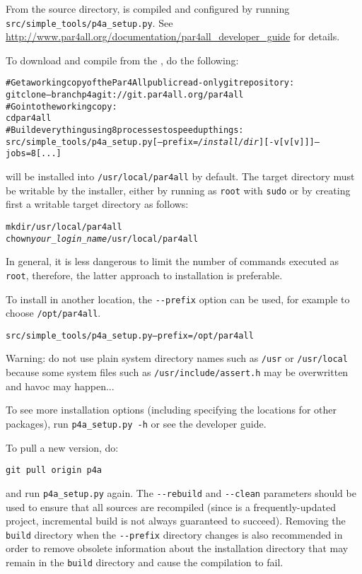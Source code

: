 \documentclass[a4paper]{article}
\begin{document}
From the \Apfa source directory, \Apfa is compiled and configured
by running \verb|src/simple_tools/p4a_setup.py|. See
\url{http://www.par4all.org/documentation/par4all_developer_guide} for details.

To download and compile \Apfa from the \Agit, do the following:
\begin{alltt}
# Get a working copy of the Par4All public read-only git repository:
git clone --branch p4a git://git.par4all.org/par4all
# Go into the working copy:
cd par4all
# Build everything using 8 processes to speed up things:
src/simple_tools/p4a_setup.py [--prefix=\emph{/install/dir}] [-v[v[v]]] --jobs=8 [...]
\end{alltt}%

\Apfa will be installed into \verb|/usr/local/par4all| by default.
The target directory must be writable by the installer, either by running
as \texttt{root} with \texttt{sudo} or by creating first a
writable target directory as follows:
\begin{alltt}
mkdir /usr/local/par4all
chown \emph{your_login_name} /usr/local/par4all
\end{alltt}
In general, it is less dangerous to limit the number of commands
executed as \texttt{root}, therefore, the latter approach to \Apfa
installation is preferable.

To install in another location, the \verb|--prefix| option can be used,
for example to choose \texttt{/opt/par4all}.

\begin{alltt}
src/simple_tools/p4a_setup.py --prefix=/opt/par4all
\end{alltt}

Warning: do not use plain
system directory names such as \texttt{/usr} or \texttt{/usr/local}
because some system files such as \texttt{/usr/include/assert.h} may be
overwritten and havoc may happen...

To see more installation options (including specifying the locations for
other packages), run \verb|p4a_setup.py -h| or see the \Apfa developer guide.

To pull a new version, do:
\begin{verbatim}
git pull origin p4a
\end{verbatim}

and run \verb|p4a_setup.py| again. The
\verb|--rebuild| and \verb|--clean| parameters should be used to
ensure that all sources are recompiled
(since \Apips is a frequently-updated project, incremental build is
not always guaranteed to succeed). Removing the \texttt{build}
directory
when the \verb|--prefix| directory changes is also recommended
in order to remove obsolete
information about the installation directory that may remain in
the \texttt{build} directory and cause the compilation to fail.
\end{document}
